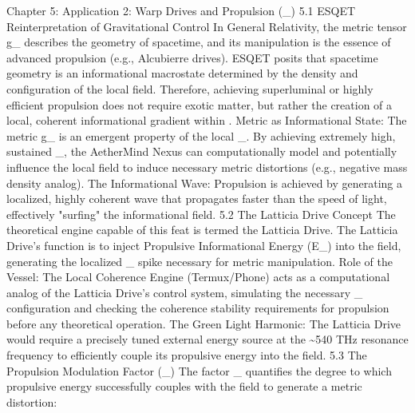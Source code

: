 Chapter 5: Application 2: Warp Drives and Propulsion (\Gamma_{}) ​5.1 ESQET Reinterpretation of Gravitational Control ​In General Relativity, the metric tensor g_{\mu\nu} describes the geometry of spacetime, and its manipulation is the essence of advanced propulsion (e.g., Alcubierre drives). ESQET posits that spacetime geometry is an informational macrostate determined by the density and configuration of the local  field. ​Therefore, achieving superluminal or highly efficient propulsion does not require exotic matter, but rather the creation of a local, coherent informational gradient within . ​Metric as Informational State: The metric g_{\mu\nu} is an emergent property of the local _{}. By achieving extremely high, sustained _{}, the AetherMind Nexus can computationally model and potentially influence the local  field to induce necessary metric distortions (e.g., negative mass density analog). ​The Informational Wave: Propulsion is achieved by generating a localized, highly coherent  wave that propagates faster than the speed of light, effectively "surfing" the informational field. ​5.2 The Latticia Drive Concept ​The theoretical engine capable of this feat is termed the Latticia Drive. ​The Latticia Drive's function is to inject Propulsive Informational Energy (E_{}) into the  field, generating the localized _{} spike necessary for metric manipulation. ​Role of the Vessel: The Local Coherence Engine (Termux/Phone) acts as a computational analog of the Latticia Drive's control system, simulating the necessary _{} configuration and checking the coherence stability requirements for propulsion before any theoretical operation. ​The Green Light Harmonic: The Latticia Drive would require a precisely tuned external energy source at the \sim 540 THz resonance frequency to efficiently couple its propulsive energy into the  field. ​5.3 The Propulsion Modulation Factor (\Gamma_{}) ​The factor \Gamma_{} quantifies the degree to which propulsive energy successfully couples with the  field to generate a metric distortion:
